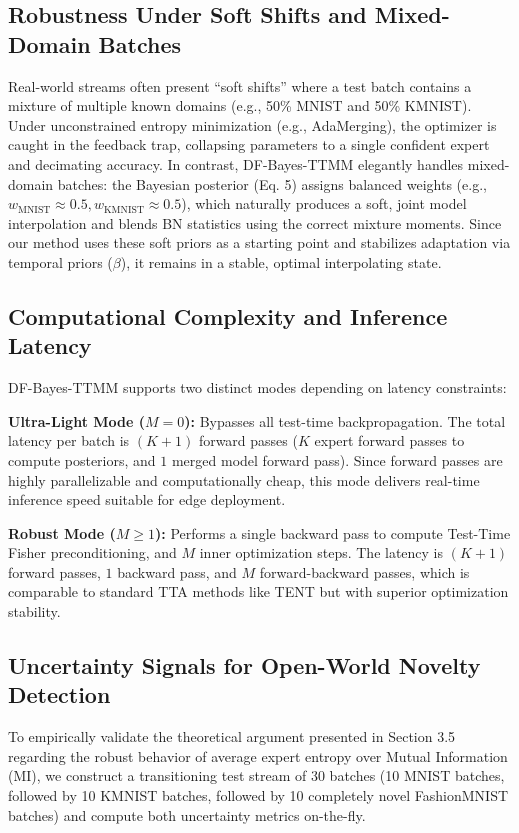 \documentclass{article}
\theoremstyle{plain}
\theoremstyle{definition}
\theoremstyle{remark}
\begin{document}
\subsection{Robustness Under Soft Shifts and Mixed-Domain Batches}
Real-world streams often present ``soft shifts'' where a test batch contains a mixture of multiple
known domains (e.g., 50\% MNIST and 50\% KMNIST). Under unconstrained entropy minimization (e.g.,
AdaMerging), the optimizer is caught in the feedback trap, collapsing parameters to a single
confident expert and decimating accuracy.
In contrast, DF-Bayes-TTMM elegantly handles mixed-domain batches: the Bayesian posterior (Eq. 5)
assigns balanced weights (e.g., $w_{\text{MNIST}} \approx 0.5, w_{\text{KMNIST}} \approx 0.5$),
which naturally produces a soft, joint model interpolation and blends BN statistics using the
correct mixture moments. Since our method uses these soft priors as a starting point and stabilizes
adaptation via temporal priors ($\beta$), it remains in a stable, optimal interpolating state.

\subsection{Computational Complexity and Inference Latency}
DF-Bayes-TTMM supports two distinct modes depending on latency constraints:

\textbf{Ultra-Light Mode ($M=0$):} Bypasses all test-time backpropagation. The total latency per
batch is $(K+1)$ forward passes ($K$ expert forward passes to compute posteriors, and $1$ merged
model forward pass). Since forward passes are highly parallelizable and computationally cheap, this
mode delivers real-time inference speed suitable for edge deployment.

\textbf{Robust Mode ($M \ge 1$):} Performs a single backward pass to compute Test-Time Fisher
preconditioning, and $M$ inner optimization steps. The latency is $(K+1)$ forward passes, $1$
backward pass, and $M$ forward-backward passes, which is comparable to standard TTA methods like
TENT \cite{Wang2021} but with superior optimization stability.

\subsection{Uncertainty Signals for Open-World Novelty Detection}
\label{sec:appendix_uncertainty_signals}
To empirically validate the theoretical argument presented in Section 3.5 regarding the robust
behavior of average expert entropy over Mutual Information (MI), we construct a transitioning test
stream of 30 batches (10 MNIST batches, followed by 10 KMNIST batches, followed by 10 completely
novel FashionMNIST batches) and compute both uncertainty metrics on-the-fly.
\end{document}
